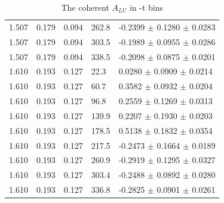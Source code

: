 \begin{table}[!h]
\begin{center}
\begin{tabular}{||l|l|l|l|l||}
  1.507 & 0.179 & 0.094 & 262.8 & -0.2399 $\pm$ 0.1280 $\pm$ 0.0283 \\                                            
  1.507 & 0.179 & 0.094 & 303.5 & -0.1989 $\pm$ 0.0955 $\pm$ 0.0286 \\                                            
  1.507 & 0.179 & 0.094 & 338.5 & -0.2098 $\pm$ 0.0875 $\pm$ 0.0201 \\                                            
  \hline                                                                                                                 
  1.610 & 0.193 & 0.127 & 22.3  &  0.0280 $\pm$ 0.0909 $\pm$ 0.0214 \\                                            
  1.610 & 0.193 & 0.127 & 60.7  &  0.3582 $\pm$ 0.0932 $\pm$ 0.0204 \\                                            
  1.610 & 0.193 & 0.127 & 96.8  &  0.2559 $\pm$ 0.1269 $\pm$ 0.0313 \\                                            
  1.610 & 0.193 & 0.127 & 139.9 &  0.2207 $\pm$ 0.1930 $\pm$ 0.0203 \\                                            
  1.610 & 0.193 & 0.127 & 178.5 &  0.5138 $\pm$ 0.1832 $\pm$ 0.0354 \\                                            
  1.610 & 0.193 & 0.127 & 217.5 & -0.2473 $\pm$ 0.1664 $\pm$ 0.0189 \\                                            
  1.610 & 0.193 & 0.127 & 260.9 & -0.2919 $\pm$ 0.1295 $\pm$ 0.0327 \\                                            
  1.610 & 0.193 & 0.127 & 303.4 & -0.2488 $\pm$ 0.0892 $\pm$ 0.0280 \\                                            
  1.610 & 0.193 & 0.127 & 336.8 & -0.2825 $\pm$ 0.0901 $\pm$ 0.0261 \\                                            
         \hline
         \hline
      \end{tabular}
      \caption{The coherent $A_{LU}$ in -t bins}
      \label{table:Coh_t_BSA}
   \end{center}
\end{table}



